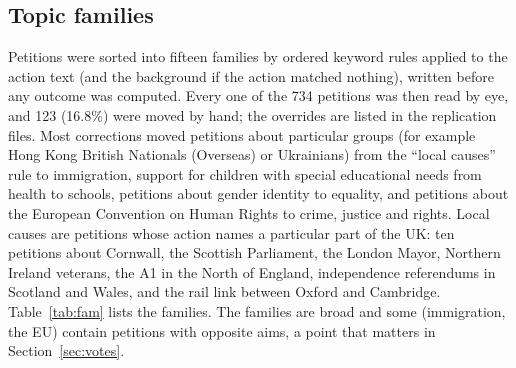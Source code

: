 \documentclass[11pt,a4paper]{article}
\begin{document}
\subsection{Topic families}\label{sec:topics}
Petitions were sorted into fifteen families by ordered keyword rules applied to the action text (and the background if the action matched nothing), written before any outcome was computed. Every one of the 734 petitions was then read by eye, and 123 (16.8\%) were moved by hand; the overrides are listed in the replication files. Most corrections moved petitions about particular groups (for example Hong Kong British Nationals (Overseas) or Ukrainians) from the ``local causes'' rule to immigration, support for children with special educational needs from health to schools, petitions about gender identity to equality, and petitions about the European Convention on Human Rights to crime, justice and rights. Local causes are petitions whose action names a particular part of the UK: ten petitions about Cornwall, the Scottish Parliament, the London Mayor, Northern Ireland veterans, the A1 in the North of England, independence referendums in Scotland and Wales, and the rail link between Oxford and Cambridge. Table~\ref{tab:fam} lists the families. The families are broad and some (immigration, the EU) contain petitions with opposite aims, a point that matters in Section~\ref{sec:votes}.
\end{document}
